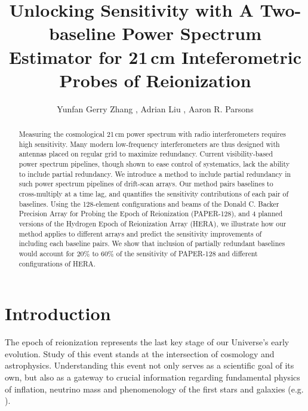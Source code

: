 \documentclass[twocolumn,apj,numberedappendix]{emulateapj}
\renewcommand\[{\begin{equation}}
\renewcommand\]{\end{equation}}
\begin{document}
\title{Unlocking Sensitivity with A Two-baseline Power Spectrum Estimator for 21\,cm Inteferometric Probes of Reionization }

\author{
Yunfan Gerry Zhang ,
Adrian Liu ,
Aaron R. Parsons
}


\begin{abstract}
Measuring the cosmological 21\,cm power spectrum with radio interferometers requires high sensitivity. Many modern low-frequency interferometers are thus designed with antennas placed on regular grid to maximize redundancy. Current visibility-based power spectrum pipelines, though shown to ease control of systematics, lack the ability to include partial redundancy. We introduce a method to include partial redundancy in such power spectrum pipelines of drift-scan arrays. Our method pairs baselines to cross-multiply at a time lag, and quantifies the sensitivity contributions of each pair of baselines. 
Using the 128-element configurations and beams of the Donald C. Backer Precision Array for Probing the Epoch of Reionization (PAPER-128), and 4 planned versions of the Hydrogen Epoch of Reionization Array (HERA), we illustrate how our method applies to different arrays and predict the sensitivity improvements of including each baseline pairs. We show that inclusion of partially redundant baselines 
would account for $20\%$ to $60\%$ of the sensitivity of PAPER-128 and different configurations of HERA. 
\end{abstract}

\section{Introduction}

The epoch of reionization represents the last key
stage of our Universe's early evolution. Study of this event stands at
the intersection of cosmology and astrophysics. Understanding this
event not only serves as a scientific goal
of its own, but also as a gateway to crucial information
regarding fundamental physics of inflation, neutrino mass and phenomenology
of the first stars and galaxies (e.g. \citealt{LiuOpticalDepth, Liu2016b, Mao2008, DEw21cm, Bull2015, Oyama20131186}). 
\end{document}
